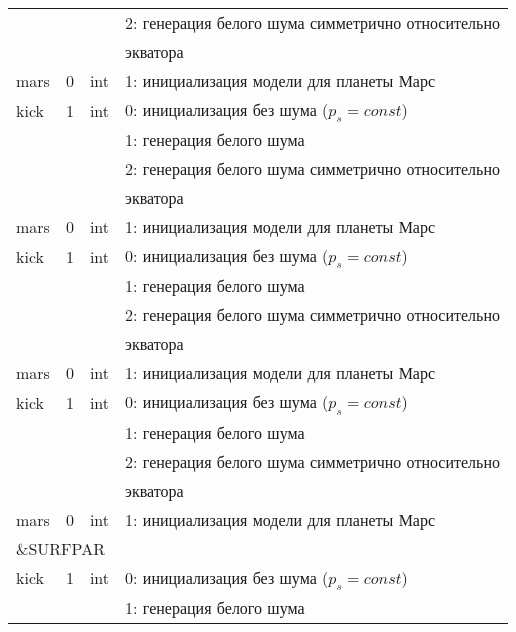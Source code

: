\begin{longtable}[c]{|l|c|l|l|}
             &        &     & 2: генерация белого шума симметрично относительно \\
             &        &     & экватора                                          \\
    mars     & 0      & int & 1: инициализация модели для планеты Марс          \\
    kick     & 1      & int & 0: инициализация без шума (\(p_s = const\))       \\
             &        &     & 1: генерация белого шума                          \\
             &        &     & 2: генерация белого шума симметрично относительно \\
             &        &     & экватора                                          \\
    mars     & 0      & int & 1: инициализация модели для планеты Марс          \\
    kick     & 1      & int & 0: инициализация без шума (\(p_s = const\))       \\
             &        &     & 1: генерация белого шума                          \\
             &        &     & 2: генерация белого шума симметрично относительно \\
             &        &     & экватора                                          \\
    mars     & 0      & int & 1: инициализация модели для планеты Марс          \\
    kick     & 1      & int & 0: инициализация без шума (\(p_s = const\))       \\
             &        &     & 1: генерация белого шума                          \\
             &        &     & 2: генерация белого шума симметрично относительно \\
             &        &     & экватора                                          \\
    mars     & 0      & int & 1: инициализация модели для планеты Марс          \\
    \hline
    \multicolumn{4}{|l|}{\&SURFPAR}                                             \\ \hline
    kick     & 1      & int & 0: инициализация без шума (\(p_s = const\))       \\
             &        &     & 1: генерация белого шума                          \\

\end{longtable}

